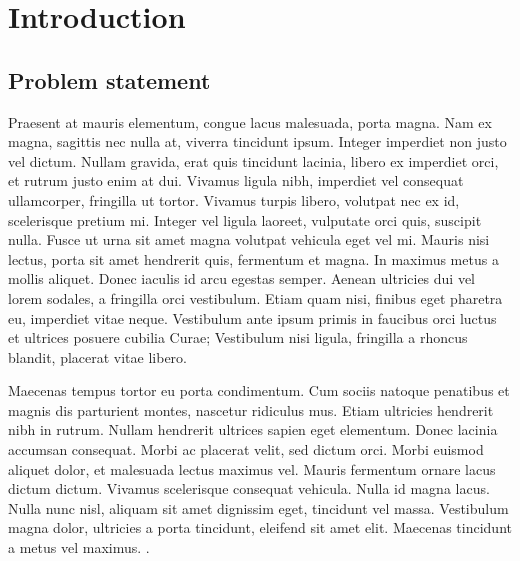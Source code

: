 \documentclass[12pt, a4paper,twoside]{tesi_upf}
\begin{document}
\tableofcontents

\listoffigures


\mainmatter
\chapter{Introduction}

\section{Problem statement}

Praesent at mauris elementum, congue lacus malesuada, porta magna. Nam ex magna, sagittis nec nulla at, viverra tincidunt ipsum. Integer imperdiet non justo vel dictum. Nullam gravida, erat quis tincidunt lacinia, libero ex imperdiet orci, et rutrum justo enim at dui. Vivamus ligula nibh, imperdiet vel consequat ullamcorper, fringilla ut tortor. Vivamus turpis libero, volutpat nec ex id, scelerisque pretium mi. Integer vel ligula laoreet, vulputate orci quis, suscipit nulla. Fusce ut urna sit amet magna volutpat vehicula eget vel mi. Mauris nisi lectus, porta sit amet hendrerit quis, fermentum et magna. In maximus metus a mollis aliquet. Donec iaculis id arcu egestas semper. Aenean ultricies dui vel lorem sodales, a fringilla orci vestibulum. Etiam quam nisi, finibus eget pharetra eu, imperdiet vitae neque. Vestibulum ante ipsum primis in faucibus orci luctus et ultrices posuere cubilia Curae; Vestibulum nisi ligula, fringilla a rhoncus blandit, placerat vitae libero.

Maecenas tempus tortor eu porta condimentum. Cum sociis natoque penatibus et magnis dis parturient montes, nascetur ridiculus mus. Etiam ultricies hendrerit nibh in rutrum. Nullam hendrerit ultrices sapien eget elementum. Donec lacinia accumsan consequat. Morbi ac placerat velit, sed dictum orci. Morbi euismod aliquet dolor, et malesuada lectus maximus vel. Mauris fermentum ornare lacus dictum dictum. Vivamus scelerisque consequat vehicula. Nulla id magna lacus. Nulla nunc nisl, aliquam sit amet dignissim eget, tincidunt vel massa. Vestibulum magna dolor, ultricies a porta tincidunt, eleifend sit amet elit. Maecenas tincidunt a metus vel maximus. \cite{Herreros2013b}.
\end{document}
